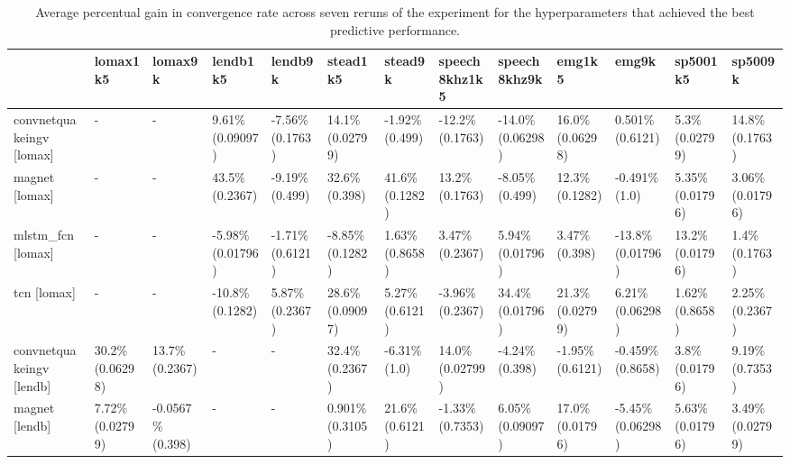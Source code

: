 \begin{table}[]
\caption{Average percentual gain in convergence rate across seven reruns of the experiment for the hyperparameters that achieved the best predictive performance.}
\begin{adjustwidth}{-1in}{-1in} %
\begin{tabular}{|l|l|l|l|l|l|l|l|l|l|l|l|l|}
\hline
  & \textbf{lomax1k5} & \textbf{lomax9k} & \textbf{lendb1k5} & \textbf{lendb9k} & \textbf{stead1k5} & \textbf{stead9k} & \textbf{speech8khz1k5} & \textbf{speech8khz9k} & \textbf{emg1k5} & \textbf{emg9k} & \textbf{sp5001k5} & \textbf{sp5009k}\\ \hline
convnetquakeingv [lomax] & - & - & 9.61\%  (0.09097) & -7.56\%  (0.1763) & \cellcolor{green} 14.1\% (0.02799) & -1.92\%  (0.499) & -12.2\%  (0.1763) & -14.0\%  (0.06298) & 16.0\%  (0.06298) & 0.501\%  (0.6121) & \cellcolor{green} 5.3\% (0.02799) & 14.8\%  (0.1763) \\ \hline
magnet [lomax] & - & - & 43.5\%  (0.2367) & -9.19\%  (0.499) & 32.6\%  (0.398) & 41.6\%  (0.1282) & 13.2\%  (0.1763) & -8.05\%  (0.499) & 12.3\%  (0.1282) & -0.491\%  (1.0) & \cellcolor{green} 5.35\% (0.01796) & \cellcolor{green} 3.06\% (0.01796) \\ \hline
mlstm\_fcn [lomax] & - & - & \cellcolor{red} -5.98\% (0.01796) & -1.71\%  (0.6121) & -8.85\%  (0.1282) & 1.63\%  (0.8658) & 3.47\%  (0.2367) & \cellcolor{green} 5.94\% (0.01796) & 3.47\%  (0.398) & \cellcolor{red} -13.8\% (0.01796) & \cellcolor{green} 13.2\% (0.01796) & 1.4\%  (0.1763) \\ \hline
tcn [lomax] & - & - & -10.8\%  (0.1282) & 5.87\%  (0.2367) & 28.6\%  (0.09097) & 5.27\%  (0.6121) & -3.96\%  (0.2367) & \cellcolor{green} 34.4\% (0.01796) & \cellcolor{green} 21.3\% (0.02799) & 6.21\%  (0.06298) & 1.62\%  (0.8658) & 2.25\%  (0.2367) \\ \hline
convnetquakeingv [lendb] & 30.2\%  (0.06298) & 13.7\%  (0.2367) & - & - & 32.4\%  (0.2367) & -6.31\%  (1.0) & \cellcolor{green} 14.0\% (0.02799) & -4.24\%  (0.398) & -1.95\%  (0.6121) & -0.459\%  (0.8658) & \cellcolor{green} 3.8\% (0.01796) & 9.19\%  (0.7353) \\ \hline
magnet [lendb] & \cellcolor{green} 7.72\% (0.02799) & -0.0567\%  (0.398) & - & - & 0.901\%  (0.3105) & 21.6\%  (0.6121) & -1.33\%  (0.7353) & 6.05\%  (0.09097) & \cellcolor{green} 17.0\% (0.01796) & -5.45\%  (0.06298) & \cellcolor{green} 5.63\% (0.01796) & \cellcolor{green} 3.49\% (0.02799) \\ \hline

\end{tabular}
\end{adjustwidth}
\end{table}
